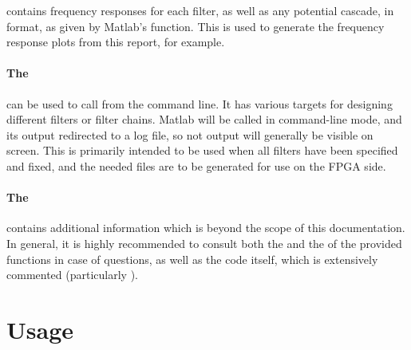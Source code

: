  contains frequency  responses for each filter, as  well as any
potential cascade, in  format,  as given by Matlab's 
function.  This  is used to  generate the  frequency response plots  from this
report, for example.

\paragraph{The  } can  be used  to call  
from the command line. It has  various targets for designing different filters
or filter chains. Matlab  will be called in command-line mode,  and its output
redirected  to  a  log file,  so  not  output  will  generally be  visible  on
screen. This  is primarily  intended to  be used  when all  filters have  been
specified and fixed, and  the needed files are to be generated  for use on the
FPGA side.

\paragraph{The  }  contains  additional information  which  is
beyond the scope  of this documentation. In general, it  is highly recommended
to  consult  both  the    and the    of  the  provided
functions  in  case  of questions,  as  well  as  the  code itself,  which  is
extensively commented (particularly ).


\section{Usage} %
\label{sec:devguide:filter_toolchain:usage}

